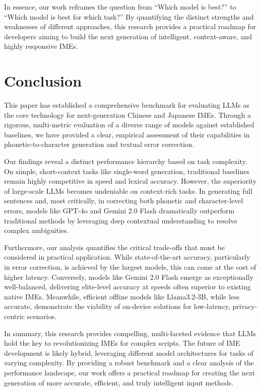 \documentclass[10pt, a4paper]{article}
\begin{document}
In essence, our work reframes the question from ``Which model is best?'' to ``Which model is best for which task?'' By quantifying the distinct strengths and weaknesses of different approaches, this research provides a practical roadmap for developers aiming to build the next generation of intelligent, context-aware, and highly responsive IMEs.

\section{Conclusion}

This paper has established a comprehensive benchmark for evaluating LLMs as the core technology for next-generation Chinese and Japanese IMEs. Through a rigorous, multi-metric evaluation of a diverse range of models against established baselines, we have provided a clear, empirical assessment of their capabilities in phonetic-to-character generation and textual error correction.

Our findings reveal a distinct performance hierarchy based on task complexity. On simple, short-context tasks like single-word generation, traditional baselines remain highly competitive in speed and lexical accuracy. However, the superiority of large-scale LLMs becomes undeniable on context-rich tasks. In generating full sentences and, most critically, in correcting both phonetic and character-level errors, models like GPT-4o and Gemini 2.0 Flash dramatically outperform traditional methods by leveraging deep contextual understanding to resolve complex ambiguities.

Furthermore, our analysis quantifies the critical trade-offs that must be considered in practical application. While state-of-the-art accuracy, particularly in error correction, is achieved by the largest models, this can come at the cost of higher latency. Conversely, models like Gemini 2.0 Flash emerge as exceptionally well-balanced, delivering elite-level accuracy at speeds often superior to existing native IMEs. Meanwhile, efficient offline models like Llama3.2-3B, while less accurate, demonstrate the viability of on-device solutions for low-latency, privacy-centric scenarios.

In summary, this research provides compelling, multi-faceted evidence that LLMs hold the key to revolutionizing IMEs for complex scripts. The future of IME development is likely hybrid, leveraging different model architectures for tasks of varying complexity. By providing a robust benchmark and a clear analysis of the performance landscape, our work offers a practical roadmap for creating the next generation of more accurate, efficient, and truly intelligent input methods.
\end{document}

